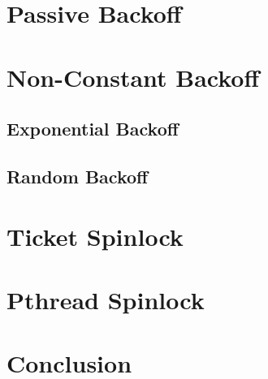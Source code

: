 \documentclass[11pt,fancy,authoryear]{elegantbook}
\begin{document}
\chapter{Passive Backoff}

\chapter{Non-Constant Backoff}

\section{Exponential Backoff}

\section{Random Backoff}

\chapter{Ticket Spinlock}

\chapter{Pthread Spinlock}

\chapter{Conclusion}
\end{document}
